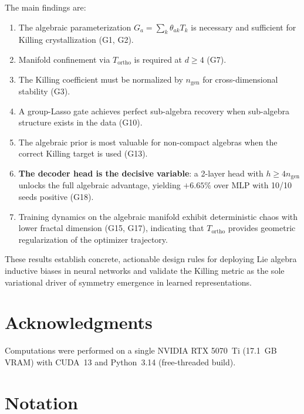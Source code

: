 \documentclass[11pt,a4paper]{article}
\newcommand{\Tortho}{T_{\mathrm{ortho}}}
\newcommand{\ngen}{n_{\mathrm{gen}}}
\theoremstyle{definition}
\begin{document}
The main findings are:
\begin{enumerate}[nosep]
  \item The algebraic parameterization $G_a = \sum_k \theta_{ak} T_k$ is 
    necessary and sufficient for Killing crystallization (G1, G2).
  \item Manifold confinement via $\Tortho$ is required at $d \geq 4$ (G7).
  \item The Killing coefficient must be normalized by $\ngen$ for 
    cross-dimensional stability (G3).
  \item A group-Lasso gate achieves perfect sub-algebra recovery when 
    sub-algebra structure exists in the data (G10).
  \item The algebraic prior is most valuable for non-compact algebras when 
    the correct Killing target is used (G13).
  \item \textbf{The decoder head is the decisive variable}: a 2-layer head 
    with $h \geq 4\ngen$ unlocks the full algebraic advantage, yielding 
    $+6.65\%$ over MLP with 10/10 seeds positive (G18).
  \item Training dynamics on the algebraic manifold exhibit deterministic 
    chaos with lower fractal dimension (G15, G17), indicating that 
    $\Tortho$ provides geometric regularization of the optimizer 
    trajectory.
\end{enumerate}

These results establish concrete, actionable design rules for deploying 
Lie algebra inductive biases in neural networks and validate the 
Killing metric as the sole variational driver of symmetry emergence in 
learned representations.


\section*{Acknowledgments}

Computations were performed on a single NVIDIA RTX 5070~Ti 
(17.1~GB VRAM) with CUDA~13 and Python~3.14 (free-threaded build).


\appendix

\section{Notation}
\label{app:notation}
\end{document}
